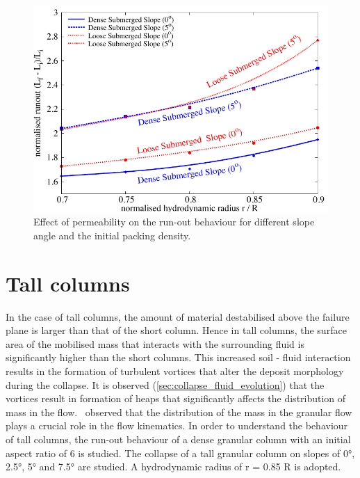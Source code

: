 \begin{figure}
\centering
\includegraphics[width=0.97\columnwidth]{Perm_Runout_slope}
\caption{Effect of permeability on the run-out behaviour for different slope 
angle and the initial packing density.}
\label{fig:Perm_Runout_slope}
\end{figure}

\section{Tall columns}

In the case of tall columns, the amount of material destabilised above the 
failure plane is larger than that of the short column. Hence in tall columns, 
the surface area of the mobilised mass that interacts with the 
surrounding fluid is significantly higher than the short columns. This 
increased soil - fluid interaction results 
in the formation of turbulent vortices that alter the deposit morphology during 
the collapse. It is observed (\cref{sec:collapse_fluid_evolution}) that the 
vortices result in formation of heaps that significantly affects the 
distribution of mass in the flow.~\citet{Staron2007a} observed that the 
distribution of the mass in the granular flow plays a crucial role in the flow 
kinematics. In order to understand the behaviour of tall columns, the run-out 
behaviour of a dense granular column with an initial aspect ratio of 6 is 
studied. The collapse of a tall granular column on slopes of 0\si{\degree}, 
2.5\si{\degree}, 5\si{\degree} and 7.5\si{\degree} are studied. A hydrodynamic 
radius of r = 0.85 R is adopted. 

